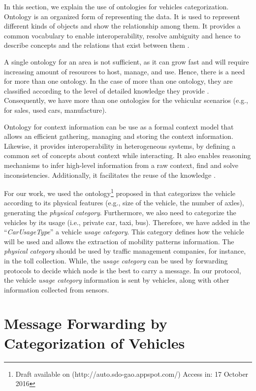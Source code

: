 \documentclass[letterpaper, 10 pt, conference]{ieeeconf}  %
\begin{document}
In this section, we explain the use of ontologies for vehicles categorization. Ontology is an organized form of representing the data. It is used to represent different kinds of objects and show the relationship among them. It provides a common vocabulary to enable interoperability, resolve ambiguity and hence to describe concepts and the relations that exist between them \cite{madkour2011}.

A single ontology for an area is not sufficient, as it can grow fast and will require increasing amount of resources to host, manage, and use. Hence, there is a need for more than one ontology. In the case of more than one ontology, they are classified according to the level of detailed knowledge they provide \cite{packer2010}. Consequently, we have more than one ontologies for the vehicular scenarios (e.g., for sales, used cars, manufacture).

Ontology for context information can be use as a formal context model that allows an efficient gathering, managing and storing the context information. Likewise, it provides interoperability in heterogeneous systems, by defining a common set of concepts about context while interacting. It also enables reasoning mechanisms to infer high-level information from a raw context, find and solve inconsistencies. Additionally, it facilitates the reuse of the knowledge \cite{serrano2007}.

For our work, we used the ontology\footnote{Draft available on (http://auto.sdo-gao.appspot.com/) Access in: 17 October 2016} proposed in \cite{gao_2016} that categorizes the vehicle according to its physical features (e.g., size of the vehicle, the number of axles), generating the \emph{physical category}. Furthermore, we also need to categorize the vehicles by its usage (i.e., private car, taxi, bus). Therefore, we have added in the ``\emph{CarUsageType}'' a vehicle \emph{usage category}.
This category defines how the vehicle will be used and allows the extraction of mobility patterns information. The \emph{physical category} should be used by traffic management companies, for instance, in the toll collection. While, the \emph{usage category} can be used by forwarding protocols to decide which node is the best to carry a message. In our protocol, the vehicle \emph{usage category} information is sent by vehicles, along with other information collected from sensors.

\section{Message Forwarding by Categorization of Vehicles}
\end{document}
